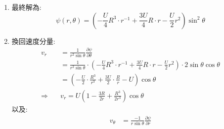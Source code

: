\documentclass[../main.tex]{subfiles}
\begin{document}
\begin{itemize}
\begin{enumerate}
\begin{enumerate}
\begin{align}
        \Rightarrow\quad & -C_1 R^{-2} + C_2 - U R = 0 \nonumber\\
        \Rightarrow\quad & -C_1 + C_2 R^2 - U R^3 = 0 \label{eq:ch2_3_stokes_sphere_bc2_sub}
      \end{align}
      \item 聯立(\ref{eq:ch2_3_stokes_sphere_bc1_sub})與(\ref{eq:ch2_3_stokes_sphere_bc2_sub}):
      \begin{align}
        C_1 + C_2 R^2 - \frac{U}{2} R^3 &= 0 \nonumber\\
        -C_1 + C_2 R^2 - U R^3 &= 0 \nonumber
      \end{align}
      相加:
      \begin{align}
        2C_2 R^2 - \frac{3U}{2} R^3 &= 0 \nonumber\\
        \Rightarrow\quad C_2 &= \frac{3U}{4} R \nonumber
      \end{align}
      帶回(\ref{eq:ch2_3_stokes_sphere_bc1_sub}):
      \begin{align}
        C_1 + \frac{3U}{4} R^3 - \frac{U}{2} R^3 &= 0 \nonumber\\
        \Rightarrow\quad C_1 &= -\frac{U}{4} R^3 \nonumber
      \end{align}
    \end{enumerate}
    \item 最終解為:
    \begin{equation}
      \boxed{\psi(r,\theta) = \left(-\frac{U}{4} R^3 \cdot r^{-1} + \frac{3U}{4} R \cdot r - \frac{U}{2} r^2\right) \sin^2\theta}
    \end{equation}
    \item 換回速度分量:
    \begin{align}
      v_r &= \frac{1}{r^2\sin\theta}\frac{\partial \psi}{\partial \theta} \nonumber\\
      &= \frac{1}{r^2\sin\theta} \cdot \left(
        -\frac{U}{4} R^3 \cdot r^{-1} + \frac{3U}{4} R \cdot r - \frac{U}{2} r^2
      \right) \cdot 2\sin\theta \cos\theta \nonumber\\
      &= \left(-\frac{U}{2} \cdot \frac{R^3}{r^3} + \frac{3U}{2} \cdot \frac{R}{r} - U\right) \cos\theta \nonumber\\
      \Rightarrow\quad & \boxed{v_r = U \left(
        1 - \frac{3R}{2r} + \frac{R^3}{2r^3}
      \right) \cos\theta} \label{eq:ch2_3_stokes_sphere_vr}
    \end{align}
    以及:
    \begin{align}
      v_\theta &= \frac{-1}{r\sin\theta}\frac{\partial \psi}{\partial r} \nonumber\\

\end{align}
\end{enumerate}
\end{itemize}
\end{document}
